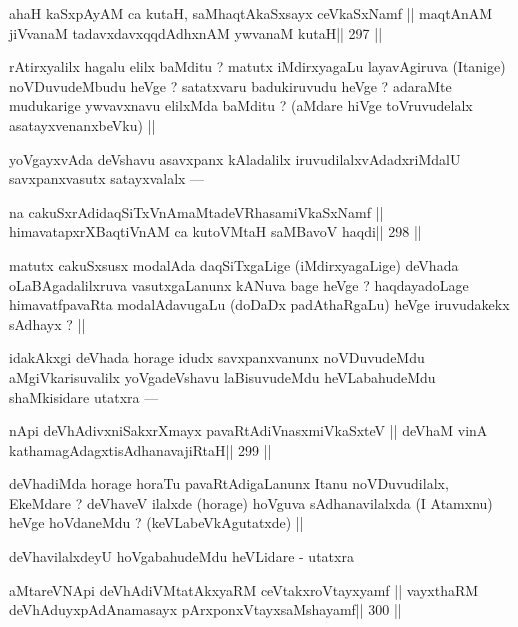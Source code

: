 \begin{shl}
ahaH kaSxpAyAM ca kutaH, saMhaqtAkaSxsayx ceVkaSxNamf ||
maqtAnAM jiVvanaM tadavxdavxqqdAdhxnAM ywvanaM kutaH\hfill || 297 ||
\end{shl}

\begin{artha}
rAtirxyalilx hagalu elilx baMditu ? matutx iMdirxyagaLu layavAgiruva (Itanige) noVDuvudeMbudu heVge ? satatxvaru badukiruvudu heVge ? adaraMte mudukarige ywvavxnavu elilxMda baMditu ? (aMdare hiVge toVruvudelalx asatayxvenanxbeVku) ||
\end{artha}

\begin{artha}
yoVgayxvAda deVshavu asavxpanx kAladalilx iruvudilalxvAdadxriMdalU savxpanxvasutx satayxvalalx ---
\end{artha}

\begin{shl}
na cakuSxrAdidaqSiTxVnAmaMtadeVRhasamiVkaSxNamf ||
himavatapxrXBaqtiVnAM ca kutoV\s MtaH saMBavoV haqdi\hfill || 298 ||
\end{shl}

\begin{artha}
matutx cakuSxsusx modalAda daqSiTxgaLige (iMdirxyagaLige) deVhada oLaBAgadalilxruva vasutxgaLanunx kANuva bage heVge ? haqdayadoLage himavatfpavaRta modalAdavugaLu (doDaDx padAthaRgaLu) heVge iruvudakekx sAdhayx ? || 
\end{artha}

\begin{artha}
idakAkxgi deVhada horage idudx savxpanxvanunx noVDuvudeMdu aMgiVkarisuvalilx yoVgadeVshavu laBisuvudeMdu heVLabahudeMdu shaMkisidare utatxra ---
\end{artha}

\begin{shl}
nApi deVhAdivxniSakxrXmayx pavaRtAdiVnasxmiVkaSxteV ||
deVhaM vinA kathamagAdagxtisAdhanavajiRtaH\hfill || 299 ||
\end{shl}

\begin{artha}
deVhadiMda horage horaTu pavaRtAdigaLanunx Itanu noVDuvudilalx, EkeMdare ? deVhaveV ilalxde (horage) hoVguva sAdhanavilalxda (I Atamxnu) heVge hoVdaneMdu ? (keVLabeVkAgutatxde) ||
\end{artha}

\begin{artha}
deVhavilalxdeyU hoVgabahudeMdu heVLidare - utatxra
\end{artha}

\begin{shl}
aMtareVNApi deVhAdiVMtatAkxyaRM ceVtakxroVtayxyamf ||
vayxthaRM deVhAduyxpAdAnamasayx pArxponxVtayxsaMshayamf\hfill || 300 ||
\end{shl}

